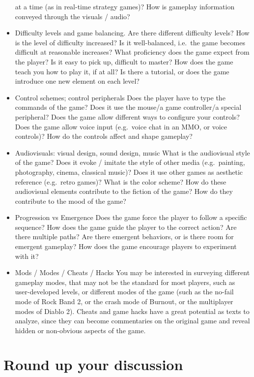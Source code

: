 \documentclass[
]{book}
\begin{document}
\begin{itemize}
  at a time (as in real-time strategy games)? How is gameplay information
  conveyed through the visuals / audio?
\item
  Difficulty levels and game balancing.
  Are there different difficulty levels? How is the level of difficulty increased? Is it
  well-balanced, i.e.~the game becomes difficult at reasonable increases? What
  proficiency does the game expect from the player? Is it easy to pick up, difficult to
  master? How does the game teach you how to play it, if at all? Is there a tutorial,
  or does the game introduce one new element on each level?
\item
  Control schemes; control peripherals
  Does the player have to type the commands of the game? Does it use the mouse/a
  game controller/a special peripheral? Does the game allow different ways to
  configure your controls? Does the game allow voice input (e.g.~voice chat in an
  MMO, or voice controls)? How do the controls affect and shape gameplay?
\item
  Audiovisuals: visual design, sound design, music
  What is the audiovisual style of the game? Does it evoke / imitate the style of
  other media (e.g.~painting, photography, cinema, classical music)? Does it use
  other games as aesthetic reference (e.g.~retro games)? What is the color scheme?
  How do these audiovisual elements contribute to the fiction of the game? How do
  they contribute to the mood of the game?
\item
  Progression vs Emergence
  Does the game force the player to follow a specific sequence? How does the game
  guide the player to the correct action? Are there multiple paths? Are there
  emergent behaviors, or is there room for emergent gameplay? How does the
  game encourage players to experiment with it?
\item
  Mods / Modes / Cheats / Hacks
  You may be interested in surveying different gameplay modes, that may not be
  the standard for most players, such as user-developed levels, or different modes
  of the game (such as the no-fail mode of Rock Band 2, or the crash mode of
  Burnout, or the multiplayer modes of Diablo 2). Cheats and game hacks have a
  great potential as texts to analyze, since they can become commentaries on the
  original game and reveal hidden or non-obvious aspects of the game.
\end{itemize}

\hypertarget{round-up-your-discussion}{%
\section{Round up your discussion}\label{round-up-your-discussion}}
\end{document}
